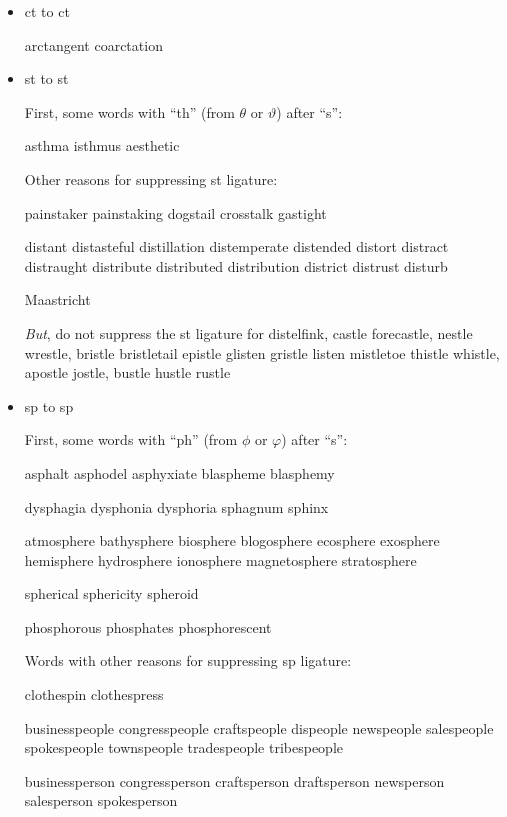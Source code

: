 \begin{itemize}

\item ct to c\hspace{0pt}t

arctangent coarctation 


\item st to s\hspace{0pt}t

First, some words with ``th'' (from $\theta$ or $\vartheta$) after ``s'':

asthma isthmus aesthetic


\medskip
Other reasons for suppressing st ligature:

painstaker painstaking dogstail crosstalk gastight

distant distasteful distillation distemperate distended distort distract distraught distribute distributed distribution district distrust disturb

Maastricht




\emph{But}, do not suppress the st ligature for  distelfink, castle forecastle, nestle wrestle, bristle bristletail epistle glisten gristle listen mistletoe thistle whistle, apostle jostle, bustle hustle rustle 




\item sp to s\hspace{0pt}p

First, some words with ``ph'' (from $\phi$ or $\varphi$) after ``s'':

asphalt asphodel asphyxiate blaspheme blasphemy

dysphagia dysphonia dysphoria sphagnum sphinx

atmosphere bathysphere biosphere blogosphere ecosphere exosphere hemisphere hydrosphere ionosphere magnetosphere stratosphere

spherical sphericity spheroid 

phosphorous phosphates phosphorescent

\medskip
Words with other reasons for suppressing sp ligature:

clothespin clothespress

businesspeople congresspeople craftspeople dispeople newspeople salespeople spokespeople townspeople tradespeople tribespeople

businessperson congressperson craftsperson draftsperson newsperson salesperson spokesperson


\end{itemize}
